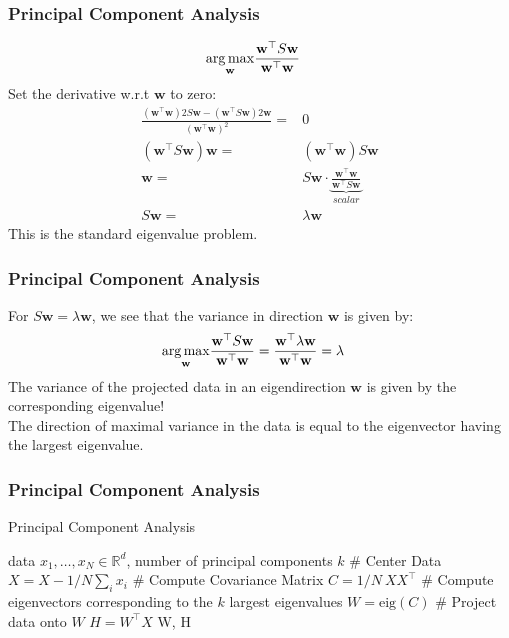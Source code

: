 \documentclass[Nike]{tuberlinbeamer}
\newcommand{\R}{\ensuremath{\mathds{R}}}
\newcommand{\bw}{\mathbf{w}}
\begin{document}
\begin{frame}\frametitle{Principal Component Analysis}
\begin{align}\nonumber
\argmax_{\bw} &\frac{\bw^{\top} S \bw}{\bw^\top\bw}
\end{align}
Set the derivative w.r.t $\bw$ to zero:\\
\begin{align}\nonumber
\frac{(\bw^{\top}\bw) 2 S \bw - (\bw^{\top}S \bw) 2 \bw}{(\bw^{\top}\bw)^2}= &0\\ \nonumber
(\bw^{\top}S\bw)\bw = & (\bw^{\top}\bw)S\bw\\ \nonumber
\bw = &S \bw \cdot \underbrace{\frac{\bw^{\top}\bw}{\bw^{\top}S\bw}}_{scalar} \\ \nonumber
S \bw = & \lambda \bw
\end{align}
This is the standard eigenvalue problem.
\end{frame}

\begin{frame}\frametitle{Principal Component Analysis}
For $S \bw = \lambda \bw $, we see that the variance in direction $\bw$ is given by:
\begin{align}\nonumber
\argmax_{\bw} &\frac{\bw^{\top} S \bw}{\bw^\top\bw} =  \frac{\bw^{\top} \lambda \bw}{\bw^\top\bw} = \lambda
\end{align}
The variance of the projected data in an eigendirection $\bw$ is given by the corresponding eigenvalue! \\ \pause
\vspace{2em}
The direction of maximal variance in the data is equal to the eigenvector having the largest eigenvalue.
\end{frame}

\begin{frame}[fragile]\frametitle{Principal Component Analysis}
\scriptsize
\begin{algorithm}[H]
  \caption{Principal Component Analysis}
  \begin{algorithmic}[1]
    \REQUIRE data $x_1, \ldots, x_N \in \R^d$, number of principal components $k$
    \STATE \# Center Data
     \STATE $X = X - 1/N\sum_ix_i$
     \STATE \# Compute Covariance Matrix
     \STATE $C = 1/N ~XX^{\top}$
     \STATE \# Compute eigenvectors corresponding to the $k$ largest eigenvalues
     \STATE $W = \text{eig}(C)$
     \STATE \# Project data onto $W$
     \STATE $H = W^\top X$
\RETURN W, H
  \end{algorithmic}
\end{algorithm}
\end{frame}
\end{document}
